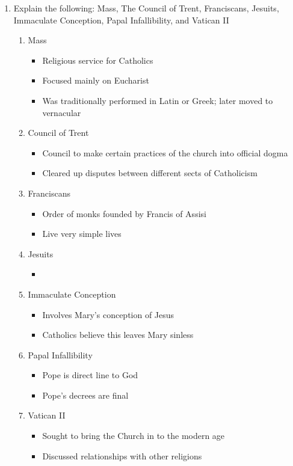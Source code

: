 \documentclass[8pt]{article}
\begin{document}
\begin{enumerate}
\begin{itemize}
    \end{itemize}

    \item Explain the following: Mass, The Council of Trent, Franciscans, Jesuits, Immaculate Conception, Papal Infallibility, and Vatican II
    \begin{enumerate}
        \item Mass
        \begin{itemize}
            \item Religious service for Catholics
            \item Focused mainly on Eucharist
            \item Was traditionally performed in Latin or Greek; later moved to vernacular
        \end{itemize}
        \item Council of Trent
        \begin{itemize}
            \item Council to make certain practices of the church into official dogma
            \item Cleared up disputes between different sects of Catholicism
        \end{itemize}
        \item Franciscans
        \begin{itemize}
            \item Order of monks founded by Francis of Assisi
            \item Live very simple lives
        \end{itemize}
        \item Jesuits
        \begin{itemize}
            \item
        \end{itemize}
        \item Immaculate Conception
        \begin{itemize}
            \item Involves Mary's conception of Jesus
            \item Catholics believe this leaves Mary sinless
        \end{itemize}
        \item Papal Infallibility
        \begin{itemize}
            \item Pope is direct line to God
            \item Pope's decrees are final
        \end{itemize}
        \item Vatican II
        \begin{itemize}
            \item Sought to bring the Church in to the modern age
            \item Discussed relationships with other religions
        \end{itemize}
    \end{enumerate}


\end{enumerate}
\end{document}
